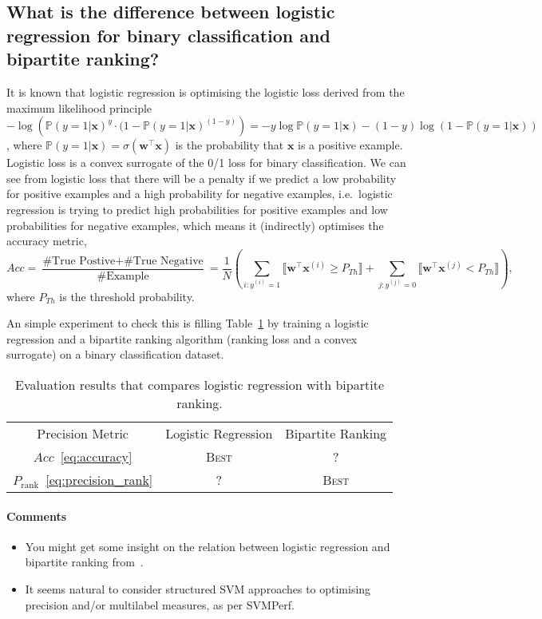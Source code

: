 \documentclass[9pt]{extarticle}
\newcommand{\llb}{\llbracket}
\newcommand{\rrb}{\rrbracket}
\newcommand{\x}{\mathbf{x}}
\newcommand{\1}{\mathbf{1}}
\newcommand{\w}{\mathbf{w}}
\newcommand{\p}{\mathbb{P}}
\newcommand{\pb}[1]{^{({#1})}}
\newcommand{\ie}{i.e.\ }
\begin{document}
\subsection*{What is the difference between logistic regression for binary classification and bipartite ranking?}

It is known that logistic regression is optimising the logistic loss derived from the maximum likelihood principle
$-\log \left( \p(y=1 |\x)^y \cdot (1 - \p(y=1 | \x)^{(1-y)} \right) = -y\log\p(y=1 | \x) - (1-y) \log(1-\p(y=1 | \x))$,
where $\p(y=1 | \x) = \sigma(\w^\top \x)$ is the probability that $\x$ is a positive example.
Logistic loss is a convex surrogate of the 0/1 loss for binary classification.
We can see from logistic loss that there will be a penalty if we predict a low probability for positive examples and 
a high probability for negative examples,
\ie logistic regression is trying to predict high probabilities for positive examples and low probabilities for negative examples,
which means it (indirectly) optimises the accuracy metric,
\begin{equation}
\label{eq:accuracy}
Acc = \frac{\text{\#True Postive} + \text{\#True Negative}}{\text{\#Example}} 
    = \frac{1}{N} \left( \sum_{i:y\pb{i}=1} \llb \w^\top \x\pb{i} \ge P_{Th} \rrb + \sum_{j:y\pb{j}=0} \llb \w^\top \x\pb{j} < P_{Th} \rrb \right),
\end{equation}
where $P_{Th}$ is the threshold probability.

An simple experiment to check this is filling Table~\ref{tab:precision} by training a logistic regression and a bipartite ranking algorithm (ranking loss and a convex surrogate) on a binary classification dataset.
\begin{table}[!h]
\centering
\begin{tabular}{c|cc} \hline \hline
Precision Metric                        & Logistic Regression & Bipartite Ranking \\
$Acc$~\ref{eq:accuracy}                 & \textsc{Best}       & ?                 \\
$P_\text{rank}$~\ref{eq:precision_rank} & ?                   & \textsc{Best}     \\ \hline
\end{tabular}
\caption{Evaluation results that compares logistic regression with bipartite ranking.}
\label{tab:precision}
\end{table}

\paragraph{Comments}
{\it
\begin{itemize}
\item You might get some insight on the relation between logistic regression and bipartite ranking from~\cite{kotlowski2011bipartite}.
\item It seems natural to consider structured SVM approaches to optimising precision and/or multilabel measures, as per SVMPerf.
\end{itemize}
}
\end{document}
